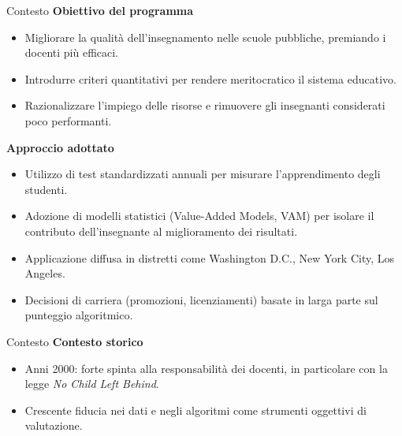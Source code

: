 \documentclass{beamer}
\begin{document}
%
%
\begin{frame}{Contesto}
\textbf{Obiettivo del programma}
\begin{itemize}
  \item Migliorare la qualit\`a dell'insegnamento nelle scuole pubbliche, premiando i docenti pi\`u efficaci.
  \item Introdurre criteri quantitativi per rendere meritocratico il sistema educativo.
  \item Razionalizzare l'impiego delle risorse e rimuovere gli insegnanti considerati poco performanti.
\end{itemize}

\textbf{Approccio adottato}
\begin{itemize}
  \item Utilizzo di test standardizzati annuali per misurare l'apprendimento degli studenti.
  \item Adozione di modelli statistici (Value-Added Models, VAM) per isolare il contributo dell'insegnante al miglioramento dei risultati.
  \item Applicazione diffusa in distretti come Washington D.C., New York City, Los Angeles.
  \item Decisioni di carriera (promozioni, licenziamenti) basate in larga parte sul punteggio algoritmico.
\end{itemize}
\end{frame}
%
%
\begin{frame}{Contesto}
\textbf{Contesto storico}
\begin{itemize}
  \item Anni 2000: forte spinta alla responsabilit\`a dei docenti, in particolare con la legge \textit{No Child Left Behind}.
  \item Crescente fiducia nei dati e negli algoritmi come strumenti oggettivi di valutazione.
\end{itemize}
\end{frame}
%
%
\end{document}
